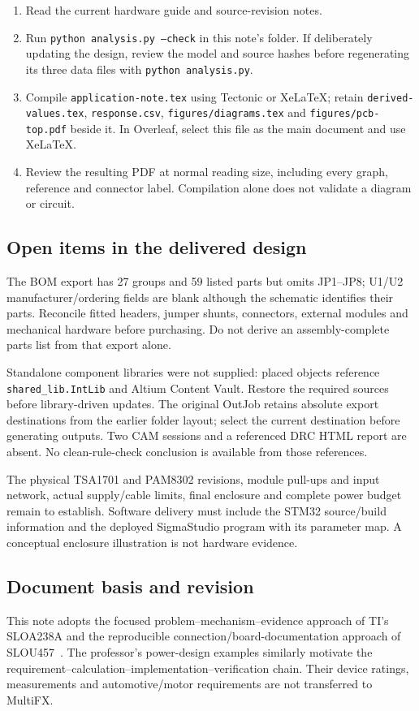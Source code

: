 \documentclass[a4paper,10pt]{article}
\newcommand{\net}[1]{\texttt{#1}}
\begin{document}
\begin{enumerate}
\item Read the current hardware guide and source-revision notes.
\item Run \net{python analysis.py --check} in this note's folder. If deliberately updating the design, review the model and source hashes before regenerating its three data files with \net{python analysis.py}.
\item Compile \net{application-note.tex} using Tectonic or XeLaTeX; retain \net{derived-values.tex}, \net{response.csv}, \net{figures/diagrams.tex} and \net{figures/pcb-top.pdf} beside it. In Overleaf, select this file as the main document and use XeLaTeX.
\item Review the resulting PDF at normal reading size, including every graph, reference and connector label. Compilation alone does not validate a diagram or circuit.
\end{enumerate}

\subsection{Open items in the delivered design}
The BOM export has 27 groups and 59 listed parts but omits JP1--JP8; U1/U2 manufacturer/ordering fields are blank although the schematic identifies their parts. Reconcile fitted headers, jumper shunts, connectors, external modules and mechanical hardware before purchasing. Do not derive an assembly-complete parts list from that export alone.

Standalone component libraries were not supplied: placed objects reference \net{shared\_lib.IntLib} and Altium Content Vault. Restore the required sources before library-driven updates. The original OutJob retains absolute export destinations from the earlier folder layout; select the current destination before generating outputs. Two CAM sessions and a referenced DRC HTML report are absent. No clean-rule-check conclusion is available from those references.

The physical TSA1701 and PAM8302 revisions, module pull-ups and input network, actual supply/cable limits, final enclosure and complete power budget remain to establish. Software delivery must include the STM32 source/build information and the deployed SigmaStudio program with its parameter map. A conceptual enclosure illustration is not hardware evidence.

\subsection{Document basis and revision}
This note adopts the focused problem--mechanism--evidence approach of TI's SLOA238A and the reproducible connection/board-documentation approach of SLOU457~\cite{example-report,example-guide}. The professor's power-design examples similarly motivate the requirement--calculation--implementation--verification chain. Their device ratings, measurements and automotive/motor requirements are not transferred to MultiFX.
\end{document}
